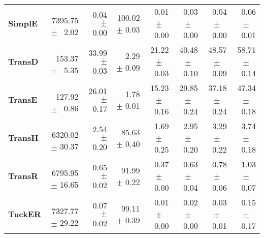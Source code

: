 \documentclass[journal]{IEEEtran}
\begin{document}
\begin{table*}
\begin{tabular}{lrrrrrrr}
\textbf{SimplE  } &  $\phantom{5}$7395.75 $\pm$ $\phantom{5}$2.02 &  $\phantom{5}$0.04 $\pm$ 0.00 &  100.02 $\pm$ 0.03 &  $\phantom{5}$0.01 $\pm$ $\phantom{5}$0.00 &  $\phantom{5}$0.03 $\pm$ $\phantom{5}$0.00 &  $\phantom{5}$0.04 $\pm$ $\phantom{5}$0.00 &  $\phantom{5}$0.06 $\pm$ $\phantom{5}$0.01 \\
\textbf{TransD  } &  $\phantom{5}$$\phantom{5}$153.37 $\pm$ $\phantom{5}$5.35 &  33.99 $\pm$ 0.03 &  $\phantom{5}$$\phantom{5}$2.29 $\pm$ 0.09 &  21.22 $\pm$ $\phantom{5}$0.03 &  40.48 $\pm$ $\phantom{5}$0.10 &  48.57 $\pm$ $\phantom{5}$0.09 &  58.71 $\pm$ $\phantom{5}$0.14 \\
\textbf{TransE  } &  $\phantom{5}$$\phantom{5}$127.92 $\pm$ $\phantom{5}$0.86 &  26.01 $\pm$ 0.17 &  $\phantom{5}$$\phantom{5}$1.78 $\pm$ 0.01 &  15.23 $\pm$ $\phantom{5}$0.16 &  29.85 $\pm$ $\phantom{5}$0.24 &  37.18 $\pm$ $\phantom{5}$0.24 &  47.34 $\pm$ $\phantom{5}$0.18 \\
\textbf{TransH  } &  $\phantom{5}$6320.02 $\pm$ 30.37 &  $\phantom{5}$2.54 $\pm$ 0.20 &  $\phantom{5}$85.63 $\pm$ 0.40 &  $\phantom{5}$1.69 $\pm$ $\phantom{5}$0.25 &  $\phantom{5}$2.95 $\pm$ $\phantom{5}$0.20 &  $\phantom{5}$3.29 $\pm$ $\phantom{5}$0.22 &  $\phantom{5}$3.74 $\pm$ $\phantom{5}$0.18 \\
\textbf{TransR  } &  $\phantom{5}$6795.95 $\pm$ 16.65 &  $\phantom{5}$0.65 $\pm$ 0.02 &  $\phantom{5}$91.99 $\pm$ 0.22 &  $\phantom{5}$0.37 $\pm$ $\phantom{5}$0.00 &  $\phantom{5}$0.63 $\pm$ $\phantom{5}$0.04 &  $\phantom{5}$0.78 $\pm$ $\phantom{5}$0.06 &  $\phantom{5}$1.03 $\pm$ $\phantom{5}$0.07 \\
\textbf{TuckER  } &  $\phantom{5}$7327.77 $\pm$ 29.22 &  $\phantom{5}$0.07 $\pm$ 0.02 &  $\phantom{5}$99.11 $\pm$ 0.39 &  $\phantom{5}$0.01 $\pm$ $\phantom{5}$0.00 &  $\phantom{5}$0.02 $\pm$ $\phantom{5}$0.00 &  $\phantom{5}$0.03 $\pm$ $\phantom{5}$0.01 &  $\phantom{5}$0.15 $\pm$ $\phantom{5}$0.17 \\
\bottomrule
\end{tabular}

\end{table*}
\end{document}

